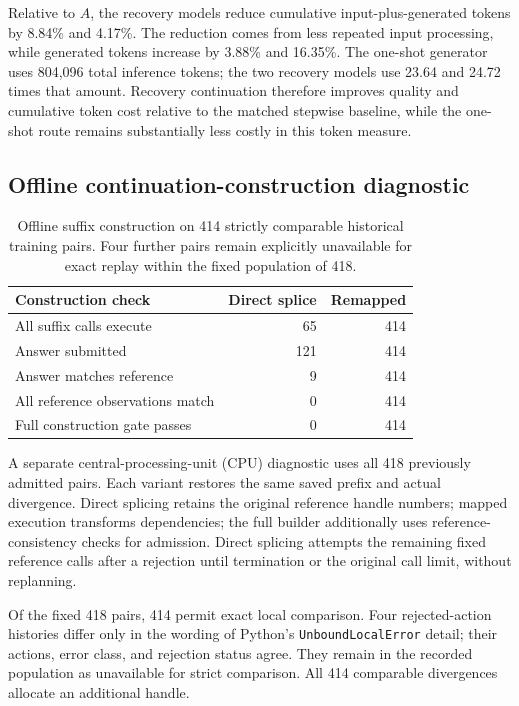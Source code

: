 \documentclass[runningheads]{llncs}
\begin{document}
Relative to $A$, the recovery models reduce cumulative input-plus-generated tokens by 8.84\% and 4.17\%. The reduction comes from less repeated input processing, while generated tokens increase by 3.88\% and 16.35\%. The one-shot generator uses 804,096 total inference tokens; the two recovery models use 23.64 and 24.72 times that amount. Recovery continuation therefore improves quality and cumulative token cost relative to the matched stepwise baseline, while the one-shot route remains substantially less costly in this token measure.

\subsection{Offline continuation-construction diagnostic}

\begin{table}[htbp]
 \centering
 \caption{Offline suffix construction on 414 strictly comparable historical training pairs. Four further pairs remain explicitly unavailable for exact replay within the fixed population of 418.}
 \label{tab:construction-en}
 \begin{tabular}{@{}lrr@{}}
\toprule
Construction check & Direct splice & Remapped \\
\midrule
All suffix calls execute & 65 & 414 \\
Answer submitted & 121 & 414 \\
Answer matches reference & 9 & 414 \\
All reference observations match & 0 & 414 \\
Full construction gate passes & 0 & 414 \\
\bottomrule
\end{tabular}
\end{table}

A separate central-processing-unit (CPU) diagnostic uses all 418 previously admitted pairs. Each variant restores the same saved prefix and actual divergence. Direct splicing retains the original reference handle numbers; mapped execution transforms dependencies; the full builder additionally uses reference-consistency checks for admission. Direct splicing attempts the remaining fixed reference calls after a rejection until termination or the original call limit, without replanning.

Of the fixed 418 pairs, 414 permit exact local comparison. Four rejected-action histories differ only in the wording of Python's \texttt{UnboundLocalError} detail; their actions, error class, and rejection status agree. They remain in the recorded population as unavailable for strict comparison. All 414 comparable divergences allocate an additional handle.
\end{document}
